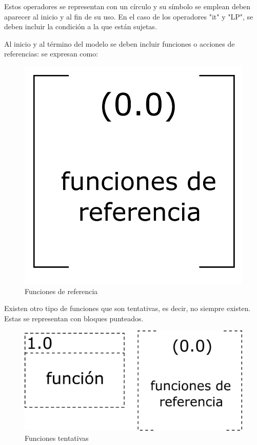 Estos operadores se representan con un círculo y su símbolo se emplean deben aparecer al inicio y al fin de su uso. En el caso de los operadores "it" y "LP", se deben incluir la condición a la que están sujetas. 

Al inicio y al término del modelo se deben incluir funciones o acciones de referencias: se expresan como:

\begin{figure}[h!]
    \centering
        \includegraphics[scale=0.20]{Proyecto Integrador Figuras/19 Funciones de Referencia.png}
        \caption{Funciones de referencia}
\end{figure}

Existen otro tipo de funciones que son tentativas, es decir, no siempre existen. Estas se representan con bloques punteados. 

\begin{figure}[h!]
    \centering
        \includegraphics[scale=0.20]{Proyecto Integrador Figuras/20 Funciones Tentativas.png}
        \caption{Funciones tentativas}
\end{figure}

